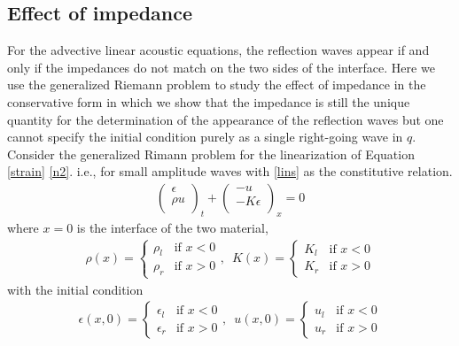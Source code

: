 \documentclass{article}
\begin{document}
\subsection{Effect of impedance}
For the advective linear acoustic equations, the reflection waves appear if and only if the impedances do not match on the two sides of the interface. Here we use the generalized Riemann problem to study the effect of impedance in the conservative form in which we show that the impedance is still the unique quantity for the determination of the appearance of the reflection waves but one cannot specify the initial condition purely as a single right-going wave in $q$. Consider the generalized Rimann problem for the linearization of Equation \eqref{strain} \eqref{n2}. i.e., for small amplitude waves with \eqref{lins} as the constitutive relation.
\begin{align}
\left(
  \begin{array}{c}
    \epsilon \\
    \rho u \\
  \end{array}
\right)_t+
\left(
             \begin{array}{c}
                      -u \\
                      -K\epsilon \\
                    \end{array}
             \right)_x=0
\end{align}
where $x=0$ is the interface of the two material,
\begin{align}
	\rho(x)=\begin{cases}\rho_l & \text{if } x<0 \\
	\rho_r & \text{if } x>0\end{cases}, \,\,\,
	K(x)=\begin{cases}K_l & \text{if } x<0 \\
	K_r & \text{if } x>0\end{cases}
\end{align}
with the initial condition
\begin{align}
	\epsilon(x,0)=\begin{cases}\epsilon_l & \text{if } x<0 \\
	\epsilon_r & \text{if } x>0\end{cases}, \,\,\,
	u(x,0)=\begin{cases}u_l & \text{if } x<0 \\
	u_r & \text{if } x>0\end{cases}
\end{align}
\end{document}
